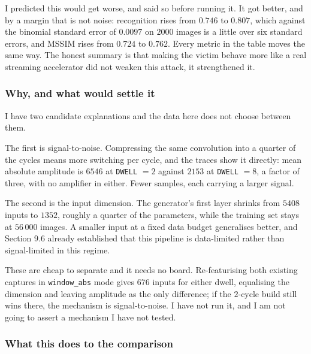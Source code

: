 \documentclass[11pt,a4paper]{article}
\begin{document}
\begin{table}[h]
  \centering
  \small
  \resizebox{\textwidth}{!}{}
  \caption{Window dwell at zero amplifier, $56$k training traces. Fewer cycles per window
  means fewer samples of it; both are consequences of the same change.}
  \label{tab:dwell}
\end{table}

I predicted this would get worse, and said so before running it. It got better, and by a
margin that is not noise: recognition rises from $0.746$ to $0.807$, which against the
binomial standard error of $0.0097$ on $2000$ images is a little over six standard errors,
and MSSIM rises from $0.724$ to $0.762$. Every metric in the table moves the same way. The
honest summary is that making the victim behave more like a real streaming accelerator did
not weaken this attack, it strengthened it.

\subsubsection*{Why, and what would settle it}

I have two candidate explanations and the data here does not choose between them.

The first is signal-to-noise. Compressing the same convolution into a quarter of the cycles
means more switching per cycle, and the traces show it directly: mean absolute amplitude is
$6546$ at \texttt{DWELL} $=2$ against $2153$ at \texttt{DWELL} $=8$, a factor of three, with
no amplifier in either. Fewer samples, each carrying a larger signal.

The second is the input dimension. The generator's first layer shrinks from $5408$ inputs
to $1352$, roughly a quarter of the parameters, while the training set stays at $56\,000$
images. A smaller input at a fixed data budget generalises better, and Section 9.6 already
established that this pipeline is data-limited rather than signal-limited in this regime.

These are cheap to separate and it needs no board. Re-featurising both existing captures in
\texttt{window\_abs} mode gives $676$ inputs for either dwell, equalising the dimension and
leaving amplitude as the only difference; if the $2$-cycle build still wins there, the
mechanism is signal-to-noise. I have not run it, and I am not going to assert a mechanism I
have not tested.

\subsubsection*{What this does to the comparison}
\end{document}
